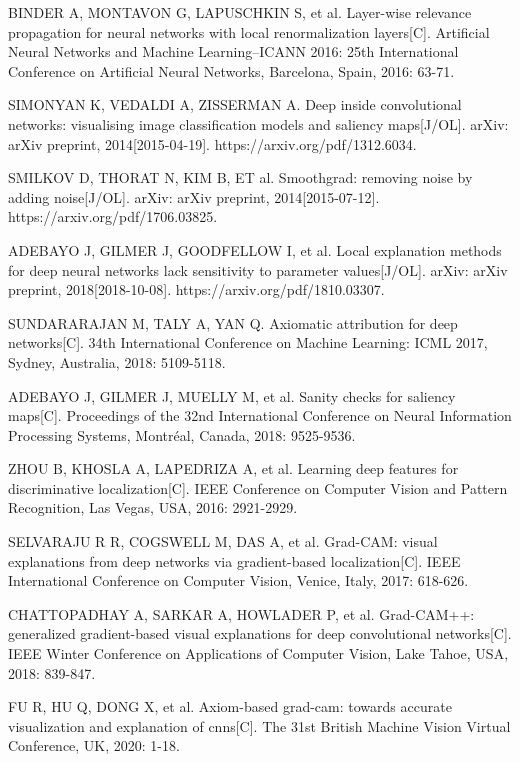 \begin{thebibliography}{200}
BINDER A, MONTAVON G, LAPUSCHKIN S, et al. Layer-wise relevance propagation for neural networks with local renormalization layers[C]. Artificial Neural Networks and Machine Learning–ICANN 2016: 25th International Conference on Artificial Neural Networks, Barcelona, Spain, 2016: 63-71.

SIMONYAN K, VEDALDI A, ZISSERMAN A. Deep inside convolutional networks: visualising image classification models and saliency maps[J/OL]. arXiv: arXiv preprint, 2014[2015-04-19]. https://arxiv.org/pdf/1312.6034.

SMILKOV D, THORAT N, KIM B, ET al. Smoothgrad: removing noise by adding noise[J/OL]. arXiv: arXiv preprint, 2014[2015-07-12]. https://arxiv.org/pdf/1706.03825.

ADEBAYO J, GILMER J, GOODFELLOW I, et al. Local explanation methods for deep neural networks lack sensitivity to parameter values[J/OL]. arXiv: arXiv preprint, 2018[2018-10-08]. https://arxiv.org/pdf/1810.03307.

SUNDARARAJAN M, TALY A, YAN Q. Axiomatic attribution for deep networks[C]. 34th International Conference on Machine Learning: ICML 2017, Sydney, Australia, 2018: 5109-5118.

ADEBAYO J, GILMER J, MUELLY M, et al.  Sanity checks for saliency maps[C]. Proceedings of the 32nd International Conference on Neural Information Processing Systems, Montréal, Canada, 2018: 9525-9536.

ZHOU B, KHOSLA A, LAPEDRIZA A, et al. Learning deep features for discriminative localization[C]. IEEE Conference on Computer Vision and Pattern Recognition, Las Vegas, USA, 2016: 2921-2929.

SELVARAJU R R, COGSWELL M, DAS A, et al. Grad-CAM: visual explanations from deep networks via gradient-based localization[C]. IEEE International Conference on Computer Vision, Venice, Italy, 2017: 618-626.

CHATTOPADHAY A, SARKAR A, HOWLADER P, et al. Grad-CAM++: generalized gradient-based visual explanations for deep convolutional networks[C]. IEEE Winter Conference on Applications of Computer Vision, Lake Tahoe, USA, 2018: 839-847.

FU R, HU Q, DONG X, et al. Axiom-based grad-cam: towards accurate visualization and explanation of cnns[C]. The 31st British Machine Vision Virtual Conference, UK, 2020: 1-18.


\end{thebibliography}
